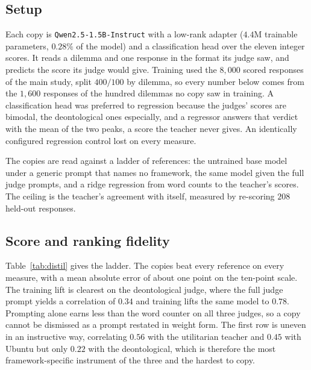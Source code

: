 \documentclass[10pt,twocolumn,a4paper]{article}
\let\cite\citep
\begin{document}
\subsection{Setup}

Each copy is \texttt{Qwen2.5-1.5B-Instruct} \cite{yang2024} with a
low-rank adapter \cite{hu2022}
($4.4$M trainable parameters, $0.28\%$ of the model) and a
classification head over the eleven integer scores. It reads a dilemma
and one response in the format its judge saw, and predicts the score
its judge would give. Training used the $8{,}000$ scored responses of
the main study, split $400/100$ by dilemma, so every number below comes
from the $1{,}600$ responses of the hundred dilemmas no copy saw in
training. A classification head was preferred to regression because the
judges' scores are bimodal, the deontological ones especially, and a
regressor answers that verdict with the mean of the two peaks, a score
the teacher never gives. An identically configured regression control
lost on every measure.

The copies are read against a ladder of references: the untrained base
model under a generic prompt that names no framework, the same model
given the full judge prompts, and a ridge regression from word counts
to the teacher's scores. The ceiling is the teacher's agreement with
itself, measured by re-scoring $208$ held-out responses.

\subsection{Score and ranking fidelity}

Table~\ref{tab:distil} gives the ladder. The copies beat every reference
on every measure, with a mean absolute error of about one point on the
ten-point scale. The training lift is clearest on the deontological
judge, where the full judge prompt yields a correlation of $0.34$ and
training lifts the same model to $0.78$. Prompting alone earns less than
the word counter on all three judges, so a copy cannot be dismissed as a
prompt restated in weight form. The first row is uneven in an
instructive way, correlating \(0.56\) with the utilitarian teacher and
\(0.45\) with Ubuntu but only \(0.22\) with the deontological, which is
therefore the most framework-specific instrument of the three and the
hardest to copy.
\end{document}
